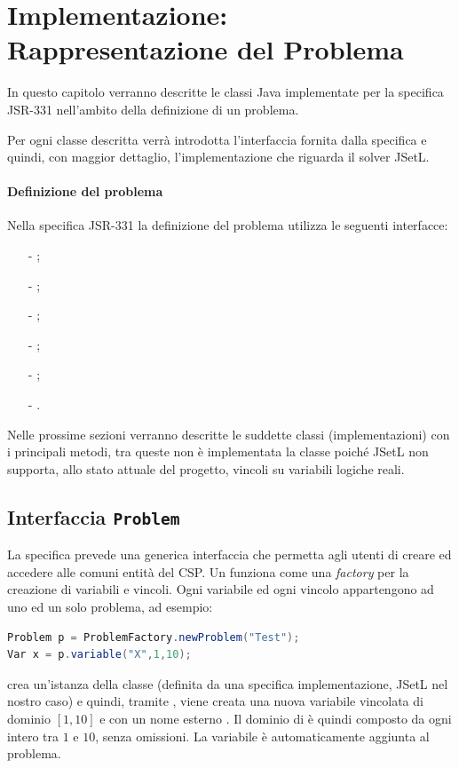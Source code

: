 
\chapter{Implementazione: Rappresentazione del Problema}\label{capImpl}
In questo capitolo verranno descritte le classi Java implementate per la
specifica JSR-331 nell'ambito della definizione di un problema.

Per ogni classe descritta verrà introdotta l'interfaccia fornita dalla 
specifica e quindi, con maggior dettaglio, l'implementazione che riguarda
il solver JSetL.

\subsubsection{Definizione del problema}
Nella specifica JSR-331 la definizione del problema utilizza le seguenti 
interfacce:
\begin{itemize}
\item[-];
\item[-];
\item[-];
\item[-];
\item[-];
\item[-].
\end{itemize}
Nelle prossime sezioni  
verranno descritte le suddette classi (implementazioni) 
con i principali metodi, tra
queste non è implementata la classe  poiché JSetL non supporta,
allo stato attuale del progetto, vincoli su variabili logiche reali.



\section{Interfaccia \texttt{Problem}}\label{intProblem}
La specifica prevede una generica interfaccia  che permetta
agli utenti di creare ed accedere alle comuni entità del CSP. Un 
 funziona come una \emph{factory} per la creazione di 
variabili e
vincoli. Ogni variabile ed ogni vincolo appartengono ad uno ed un solo problema,
ad esempio:
\begin{lstlisting}[language = Java, frame = single]
Problem p = ProblemFactory.newProblem("Test");
Var x = p.variable("X",1,10);
\end{lstlisting}
crea un'istanza  della classe  (definita da una
specifica implementazione, JSetL nel nostro caso) e quindi, tramite ,
viene creata una nuova variabile vincolata  di dominio $[1,10]$ e 
con un nome esterno . Il dominio di  è quindi composto da ogni
intero tra $1$ e $10$, senza omissioni. La variabile è automaticamente aggiunta
al problema.

